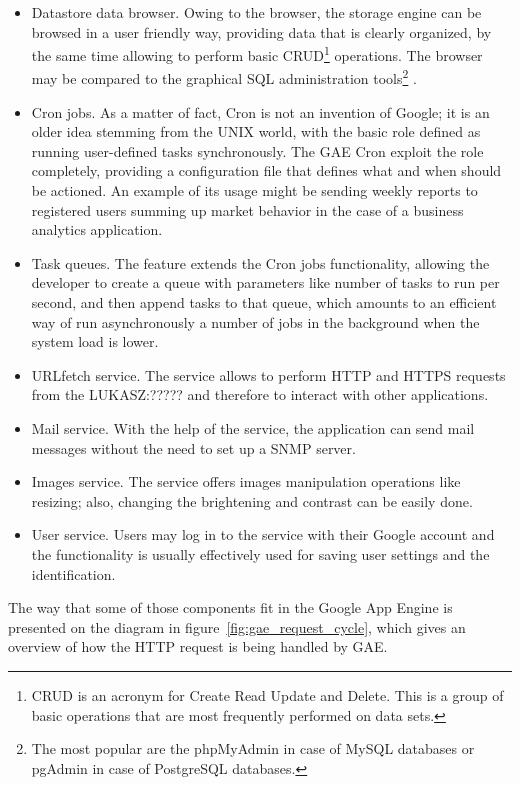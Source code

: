 \begin{itemize}
\item{Datastore data browser. Owing to the browser, the storage engine can be browsed in a user friendly way, providing data that is clearly organized, by the same time allowing to perform basic CRUD\footnote{CRUD is an acronym for Create Read Update and Delete. This is a group of basic operations that are most frequently performed on data sets.} operations. The browser may be compared to the graphical SQL administration tools\footnote{The most popular are the phpMyAdmin in case of MySQL databases or pgAdmin in case of PostgreSQL databases.} .}
\item{Cron jobs.} As a matter of fact, Cron is not an invention of Google; it is an older idea stemming from the UNIX world, with the basic role defined as running user-defined tasks synchronously. The GAE Cron exploit the role completely, providing a configuration file that defines what and when should be actioned. An example of its usage might be sending weekly reports to registered users summing up market behavior in the case of a business analytics application.     
\item{Task queues.} The feature extends the Cron jobs functionality, allowing the developer to create a queue with parameters like number of tasks to run per second, and then append tasks to that queue, which amounts to an efficient way of run asynchronously a number of jobs in the background when the system load is lower.  
\item{URLfetch service. The service allows to perform HTTP and HTTPS requests from the LUKASZ:????? and therefore to interact with other applications.}
\item{Mail service. With the help of the service, the application can send mail messages without the need to set up a SNMP server.}
\item{Images service. The service offers images manipulation operations like resizing; also, changing the brightening and contrast can be easily done.	}
\item{User service. Users may log in to the service with their Google account and the functionality is usually effectively used for saving user settings and the identification.} 
\end{itemize}
The way that some of those components fit in the Google App Engine is presented on the diagram in figure~\ref{fig:gae_request_cycle}, which gives an overview of how the HTTP request is being handled by GAE.\newpage 
